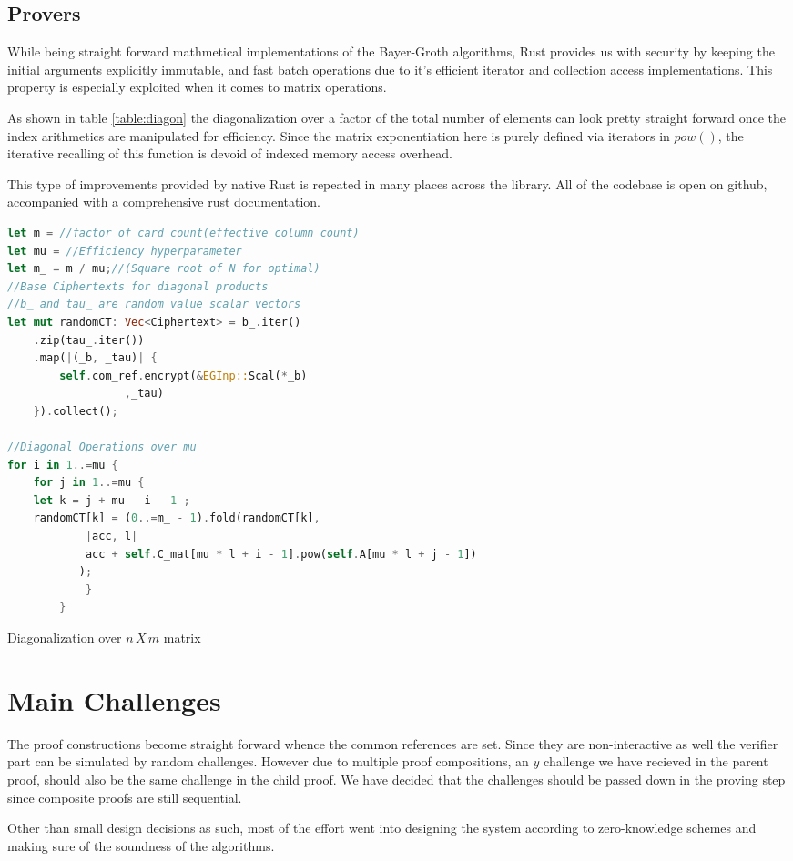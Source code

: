\documentclass[12pt,a4paper]{report}
\begin{document}
\subsection*{Provers}
While being straight forward mathmetical implementations of the Bayer-Groth algorithms, 
Rust provides us with security by keeping the initial arguments explicitly immutable, 
and fast batch operations due to it's efficient iterator and collection access implementations.
This property is especially exploited when it comes to matrix operations.\par
As shown in table \ref{table:diagon} the diagonalization over a factor of the total number of elements
can look pretty straight forward once the index arithmetics are manipulated for efficiency.
Since the matrix exponentiation here is purely defined via iterators in $pow()$, 
the iterative recalling of this function is devoid of indexed memory access overhead.\par
This type of improvements provided by native Rust is repeated in many places across the library.
All of the codebase is open on github\cite{repo}, accompanied with a comprehensive rust documentation.

\begin{table}
\begin{lstlisting}[language=Rust]
let m = //factor of card count(effective column count)
let mu = //Efficiency hyperparameter
let m_ = m / mu;//(Square root of N for optimal)
//Base Ciphertexts for diagonal products
//b_ and tau_ are random value scalar vectors
let mut randomCT: Vec<Ciphertext> = b_.iter()
	.zip(tau_.iter())
	.map(|(_b, _tau)| {
	    self.com_ref.encrypt(&EGInp::Scal(*_b) 
				  ,_tau)
	}).collect();

//Diagonal Operations over mu
for i in 1..=mu {
    for j in 1..=mu {
	let k = j + mu - i - 1 ;
	randomCT[k] = (0..=m_ - 1).fold(randomCT[k],
		    |acc, l|
			acc + self.C_mat[mu * l + i - 1].pow(self.A[mu * l + j - 1])
		   );
            }
        }
\end{lstlisting}
\caption{Diagonalization over $n\,X\,m$ matrix}
\label{table:diagon}
\end{table}

\section{Main Challenges}
The proof constructions become straight forward whence the common references are set. 
Since they are non-interactive as well the verifier part can be simulated by random challenges.
However due to multiple proof compositions, an $y$ challenge we have recieved in the parent proof,
should also be the same challenge in the child proof. We have decided that the challenges should be passed down in the proving step since composite proofs are still sequential.\par
Other than small design decisions as such, most of the effort went into designing the system according to zero-knowledge schemes and making sure of the soundness of the algorithms.
\end{document}
